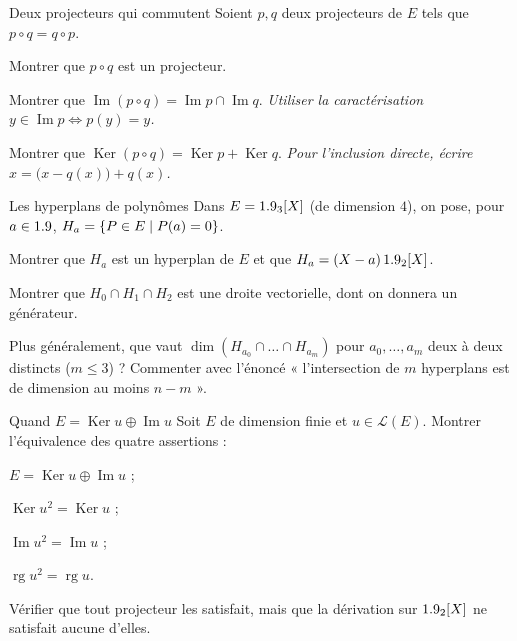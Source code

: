 \begin{exercice}[3]{Deux projecteurs qui commutent}
Soient $p,q$ deux projecteurs de $E$ tels que $p\circ q=q\circ p$.
\begin{questions}
  \item Montrer que $p\circ q$ est un projecteur.
  \item Montrer que
    $\operatorname{Im}(p\circ q)=\operatorname{Im}p\cap\operatorname{Im}q$.
    \emph{Utiliser la caractérisation $y\in\operatorname{Im}p\iff p(y)=y$.}
  \item Montrer que
    $\operatorname{Ker}(p\circ q)=\operatorname{Ker}p+\operatorname{Ker}q$.
    \emph{Pour l'inclusion directe, écrire $x=\bigl(x-q(x)\bigr)+q(x)$.}
\end{questions}
\end{exercice}

\begin{exercice}[3]{Les hyperplans de polynômes}
Dans $E=1.9_3[X]$ (de dimension $4$), on pose, pour $a\in1.9$,
$H_a=\left\{P\in E\mid P(a)=0\right\}$.
\begin{questions}
  \item Montrer que $H_a$ est un hyperplan de $E$ et que
    $H_a=(X-a)\,1.9_2[X]$.
  \item Montrer que $H_0\cap H_1\cap H_2$ est une droite vectorielle, dont
    on donnera un générateur.
  \item Plus généralement, que vaut
    $\dim(H_{a_0}\cap\dots\cap H_{a_m})$ pour $a_0,\dots,a_m$ deux à deux
    distincts ($m\leqslant3$) ? Commenter avec l'énoncé « l'intersection
    de $m$ hyperplans est de dimension au moins $n-m$ ».
\end{questions}
\end{exercice}

\begin{exercice}[3]{Quand $E=\operatorname{Ker}u\oplus\operatorname{Im}u$}
Soit $E$ de dimension finie et $u\in\mathcal{L}(E)$. Montrer l'équivalence
des quatre assertions :
\begin{questions}
  \item $E=\operatorname{Ker}u\oplus\operatorname{Im}u$ ;
  \item $\operatorname{Ker}u^{2}=\operatorname{Ker}u$ ;
  \item $\operatorname{Im}u^{2}=\operatorname{Im}u$ ;
  \item $\operatorname{rg}u^{2}=\operatorname{rg}u$.
\end{questions}
Vérifier que tout projecteur les satisfait, mais que la dérivation sur
$1.9_2[X]$ ne satisfait aucune d'elles.
\end{exercice}


